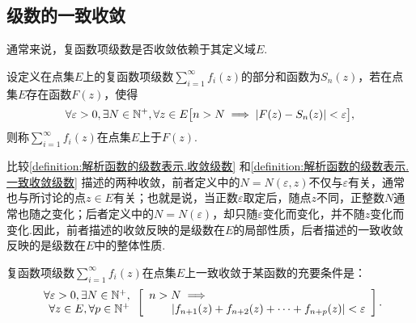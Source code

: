 \subsection{级数的一致收敛}
通常来说，复函数项级数是否收敛依赖于其定义域\(E\).
\begin{definition}\label{definition:解析函数的级数表示.一致收敛级数}
设定义在点集\(E\)上的复函数项级数\(\sum\limits_{i=1}^{\infty} f_i(z)\)的部分和函数为\(S_n(z)\)，若在点集\(E\)存在函数\(F(z)\)，使得\[
\forall\varepsilon>0,
\exists N \in \mathbb{N}^+,
\forall z \in E
\bigl[
	n>N \implies \abs{F(z) - S_n(z)} < \varepsilon
\bigr],
\]则称\(\sum\limits_{i=1}^{\infty} f_i(z)\)在点集\(E\)上于\(F(z)\).
\end{definition}

比较\cref{definition:解析函数的级数表示.收敛级数} 和\cref{definition:解析函数的级数表示.一致收敛级数} 描述的两种收敛，前者定义中的\(N = N(\varepsilon, z)\)不仅与\(\varepsilon\)有关，通常也与所讨论的点\(z \in E\)有关；也就是说，当正数\(\varepsilon\)取定后，随点\(z\)不同，正整数\(N\)通常也随之变化；后者定义中的\(N = N(\varepsilon)\)，却只随\(\varepsilon\)变化而变化，并不随\(z\)变化而变化.因此，前者描述的收敛反映的是级数在\(E\)的局部性质，后者描述的一致收敛反映的是级数在\(E\)中的整体性质.

\begin{theorem}[柯西一致收敛准则]\label{theorem:无穷级数.柯西一致收敛准则}
复函数项级数\(\sum\limits_{i=1}^{\infty} f_i(z)\)在点集\(E\)上一致收敛于某函数的充要条件是：\[
\begin{array}{r}
\forall\varepsilon>0,
\exists N \in \mathbb{N}^+, \\
\forall z \in E,
\forall p \in \mathbb{N}^+
\end{array}
\left[
\begin{array}{l}
n > N \implies \\
\hspace{20pt}
\abs{f_{n+1}(z) + f_{n+2}(z) + \dotsb + f_{n+p}(z)} < \varepsilon
\end{array}
\right].
\]
\end{theorem}

